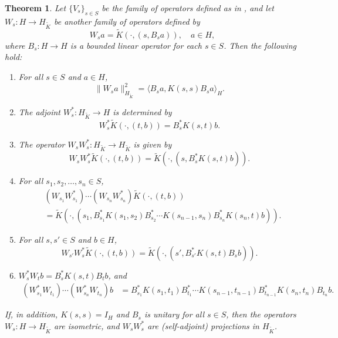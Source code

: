 \documentclass[11pt]{amsart}
\newtheorem{theorem}{Theorem}[section]
\theoremstyle{definition}
\numberwithin{equation}{section}
\begin{document}
\begin{theorem}\label{thm:extended-family}
Let \( \{V_s\}_{s \in S} \) be the family of operators defined as in \cite[Theorem 3.1 ]{Jorgensen2024}, and let \( W_s: H \rightarrow H_{\tilde{K}} \) be another family of operators defined by
\[
W_s a = \tilde{K}(\cdot, (s, B_s a)), \quad a \in H,
\]
where \( B_s: H \to H \) is a bounded linear operator for each \( s \in S \). Then the following hold:
\begin{enumerate}
    \item For all \( s \in S \) and \( a \in H \),
    \[
    \|W_s a\|_{H_{\tilde{K}}}^2 = \langle B_s a, K(s,s) B_s a \rangle_H.
    \]
    \item The adjoint \( W_s^*: H_{\tilde{K}} \to H \) is determined by
    \[
    W_s^* \tilde{K}(\cdot, (t,b)) = B_s^* K(s,t) b.
    \]
    \item The operator \( W_s W_s^*: H_{\tilde{K}} \to H_{\tilde{K}} \) is given by
    \[
    W_s W_s^* \tilde{K}(\cdot, (t,b)) = \tilde{K}(\cdot, (s, B_s^* K(s,t) b)).
    \]
    \item For all \( s_1, s_2, \dots, s_n \in S \),
    \begin{align*}
        & (W_{s_1} W_{s_1}^*) \cdots (W_{s_n} W_{s_n}^*) \tilde{K}(\cdot, (t,b)) \\
        &= \tilde{K}\left(\cdot, \left(s_1, B_{s_1}^* K(s_1, s_2) B_{s_2}^* \cdots K(s_{n-1}, s_n) B_{s_n}^* K(s_n, t) b\right)\right).
    \end{align*}
    \item For all \( s, s' \in S \) and \( b \in H \),
    \[
    W_{s'} W_s^* \tilde{K}(\cdot, (t,b)) = \tilde{K}(\cdot, (s', B_{s'}^* K(s,t) B_s b)).
    \]
    \item \( W_s^* W_t b = B_s^* K(s,t) B_t b \), and 
    \begin{align*}
    \left(W_{s_1}^* W_{t_1}\right) \cdots \left(W_{s_n}^* W_{t_n}\right) b 
    &= B_{s_1}^* K(s_1, t_1) B_{t_1}^* \cdots K(s_{n-1}, t_{n-1}) B_{t_{n-1}}^* K(s_n, t_n) B_{t_n} b.
    \end{align*}
\end{enumerate}
If, in addition, \( K(s,s) = I_H \) and \( B_s \) is unitary for all \( s \in S \), then the operators \( W_s: H \to H_{\tilde{K}} \) are isometric, and \( W_s W_s^* \) are (self-adjoint) projections in \( H_{\tilde{K}} \).
\end{theorem}
\end{document}
